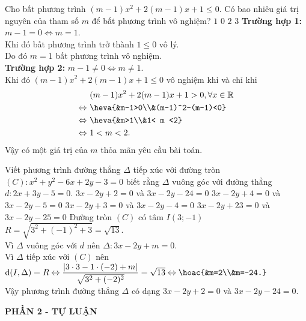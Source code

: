 \begin{ex}%
Cho bất phương trình $(m-1)x^2+2(m-1)x+1\leq0$. Có bao nhiêu giá trị nguyên của tham số $m$ để bất phương trình vô nghiệm?
\choice
{\True $1$}
{$0$}
{$2$}
{$3$}
\loigiai
{
\textbf{Trường hợp 1:} $m-1=0\Leftrightarrow m = 1$.\\ Khi đó bất phương trình trở thành $1\leq 0$ vô lý.\\Do đó $m=1$ bất phương trình vô nghiệm. \\
\textbf{Trường hợp 2:} $m-1\ne0\Leftrightarrow m \ne 1$.\\ Khi đó $(m-1)x^2+2(m-1)x+1\leq0$ vô nghiệm khi và chỉ khi
$$\begin{aligned}
& \ (m-1)x^2+2(m-1)x+1>0,\forall x \in \mathbb{R} \\
\Leftrightarrow & \ \heva{&m-1>0\\&(m-1)^2-(m-1)<0} \\
\Leftrightarrow & \ \heva{&m>1\\&1< m <2} \\
\Leftrightarrow & \ 1< m <2.
\end{aligned}$$
Vậy có một giá trị của $m$ thỏa mãn yêu cầu bài toán.
}
\end{ex}

\begin{ex}%
Viết phương trình đường thẳng $\Delta$ tiếp xúc với đường tròn $(C)\colon x^2+y^2-6x+2y-3=0$ biết rằng $\Delta$ vuông góc với đường thẳng $d\colon 2x+3y-5=0$.
\choice
{\True $3x-2y+2=0$ và $3x-2y-24=0$}
{$3x-2y+4=0$ và $3x-2y-5=0$}
{$3x-2y+3=0$ và $3x-2y-4=0$}
{$3x-2y+23=0$ và $3x-2y-25=0$}
\loigiai
{Đường tròn $(C)$ có tâm $I(3;-1)$ $R=\sqrt{3^2+(-1)^2+3}=\sqrt{13}$.\\
Vì $\Delta$ vuông góc với $d$ nên $\Delta \colon 3x-2y+m=0$.\\
Vì $\Delta$ tiếp xúc với $(C)$ nên $\mathrm{d}(I,\Delta)=R\Leftrightarrow \dfrac{|3\cdot 3-1\cdot (-2)+m|}{\sqrt{3^2+(-2)^2}}=\sqrt{13}\Leftrightarrow\hoac{&m=2\\&m=-24.}$\\
Vậy phương trình đường thẳng $\Delta$ có dạng $3x-2y+2=0$ và $3x-2y-24=0$.
}
\end{ex}
\begin{center}
	\textbf{PHẦN 2 - TỰ LUẬN}
\end{center}

